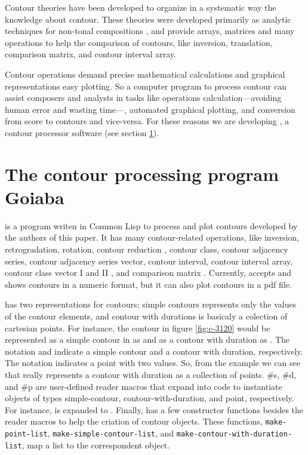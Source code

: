 Contour theories
\cite{friedmann85:methodology,friedmann87:response,morris87:composition,morris93:directions,marvin.ea87:relating,marvin88:generalized,marvin.ea95:generalization,polansky.ea92:possible,quinn97:fuzzy,clifford95:contour,beard03:contour}
have been developed to organize in a systematic way the knowledge
about contour. These theories were developed primarily as analytic
techniques for non-tonal compositions \cite{beard03:contour}, and
provide arrays, matrices and many operations to help the comparison of
contours, like inversion, translation, comparison matrix, and contour
interval array.

Contour operations demand precise mathematical calculations and
graphical representations easy plotting. So a computer program to
process contour can assist composers and analysts in tasks like
operations calculation---avoiding human error and wasting time---,
automated graphical plotting, and conversion from score to contours
and vice-versa. For these reasons we are developing \goiaba{}, a
contour processor software (see section \ref{sec:goiaba}).

\section{The contour processing program Goiaba}
\label{sec:goiaba}

\goiaba{} is a program writen in Common Lisp
\cite{graham94:lisp,team07:sbcl} to process and plot contours
developed by the authors of this paper. It has many contour-related
operations, like inversion, retrogradation, rotation, contour
reduction \cite{adams76:melodic}, contour class, contour adjacency
series, contour adjacency series vector, contour interval, contour
interval array, contour class vector I and II
\cite{friedmann85:methodology}, and comparison matrix
\cite{morris93:directions}. Currently, \goiaba{} accepts and shows
contours in a numeric format, but it can also plot contours in a pdf
file.

\goiaba{} has two representations for contours; simple contours
represents only the values of the contour elements, and contour with
durations is basicaly a colection of cartesian points. For instance,
the contour in figure \ref{fig:c-3120} would be represented as a
simple contour in \goiaba{} as  and as a contour
with duration as . The
notation  and  indicate a simple
contour and a contour with duration, respectively. The notation
 indicates a point with two values. So, from the
example we can see that \goiaba{} really represents a contour with
duration as a collection of points. \#s, \#d, and \#p are user-defined
reader macros that expand into code to instantiate objects of types
simple-contour, contour-with-duration, and point, respectively. For
instance,  is expanded to . Finally, \goiaba{} has a few constructor functions besides
the reader macros to help the criation of contour objects. These
functions, \texttt{make-point-list},
\texttt{make-sim\-ple-contour-list}, and
\texttt{make-contour-with-dura\-tion-list}, map a list to the
correspondent object.

